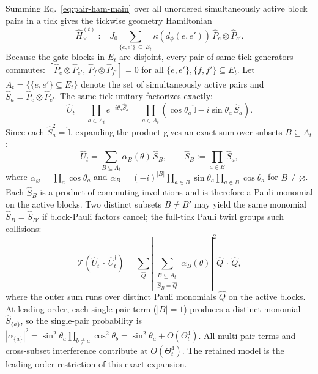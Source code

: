 \documentclass[
aps,
prx,
10pt,
twocolumn,
groupedaddress,
longbibliography,
nofootinbib,
floatfix
]{revtex4-2}
\theoremstyle{definition}
\newcommand{\I}{\hat{\mathbb{I}}}
\newcommand{\Hxt}{\hat H_{\times}^{(t)}}
\begin{document}
Summing Eq.~\eqref{eq:pair-ham-main} over all unordered simultaneously active block pairs in a tick gives the tickwise geometry Hamiltonian
\begin{equation}
\Hxt
:=
J_0
\sum_{\{e,e'\}\,\subseteq \,E_t}
\kappa\left(d_{\phi}(e,e')\right)\,
\hat P_e\otimes\hat P_{e'}.
\label{eq:tick-ham-main}
\end{equation}
Because the gate blocks in $E_t$ are disjoint, every pair of same-tick generators commutes: $[\hat P_e\otimes\hat P_{e'},\,\hat P_f\otimes\hat P_{f'}]=0$ for all $\{e,e'\},\{f,f'\}\subseteq E_t$. Let $A_t=\{\{e,e'\}\subseteq E_t\}$ denote the set of simultaneously active pairs and $\hat S_a=\hat P_e\otimes\hat P_{e'}$. The same-tick unitary factorizes exactly:
\begin{equation}
\hat U_t = \prod_{a\in A_t} e^{-i\theta_a \hat S_a} = \prod_{a\in A_t}\!\left(\cos\theta_a\,\I - i\sin\theta_a\,\hat S_a\right).
\label{eq:tick-factorize}
\end{equation}
Since each $\hat S_a^2=\I$, expanding the product gives an exact sum over subsets $B\subseteq A_t$:
\begin{equation}
\hat U_t = \sum_{B\subseteq A_t} \alpha_B(\theta)\,\hat S_B, \qquad \hat S_B := \prod_{a\in B}\hat S_a,
\label{eq:parity-expansion}
\end{equation}
where $\alpha_\varnothing = \prod_a \cos\theta_a$ and $\alpha_B = (-i)^{|B|}\prod_{a\in B}\sin\theta_a\prod_{a\notin B}\cos\theta_a$ for $B\neq\varnothing$. Each $\hat S_B$ is a product of commuting involutions and is therefore a Pauli monomial on the active blocks. Two distinct subsets $B\neq B'$ may yield the same monomial $\hat S_B=\hat S_{B'}$ if block-Pauli factors cancel; the full-tick Pauli twirl groups such collisions:
\begin{equation}
\mathcal T(\hat U_t\,\cdot\,\hat U_t^\dagger) = \sum_{\hat Q}\left|\sum_{\substack{B\subseteq A_t\\\hat S_B=\hat Q}} \alpha_B(\theta)\right|^2\hat Q\,\cdot\,\hat Q,
\label{eq:tick-twirl}
\end{equation}
where the outer sum runs over distinct Pauli monomials $\hat Q$ on the active blocks. At leading order, each single-pair term ($|B|=1$) produces a distinct monomial $\hat S_{\{a\}}$, so the single-pair probability is $|\alpha_{\{a\}}|^2 = \sin^2\theta_a\prod_{b\neq a}\cos^2\theta_b = \sin^2\theta_a + O(\Theta_t^4)$. All multi-pair terms and cross-subset interference contribute at $O(\Theta_t^4)$. The retained model is the leading-order restriction of this exact expansion.
\end{document}
